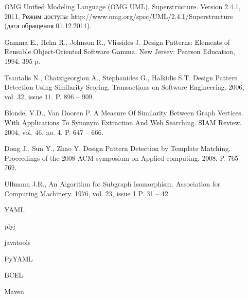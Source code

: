 \begin{thebibliography}{1}

\begin{flushleft}
OMG Unified Modeling Language (OMG UML), Superstructure. Version 2.4.1, 2011, Режим доступа: http://www.omg.org/spec/UML/2.4.1/Superstructure (дата обращения 01.12.2014).
\end{flushleft}

\begin{flushleft}
Gamma E., Helm R., Johnson R., Vlissides J. Design Patterns: Elements of Reusable Object-Oriented Software Gamma. New Jersey: Pearson Education, 1994. 395 p.
\end{flushleft}

\begin{flushleft}
Tsantalis N., Chatzigeorgiou A., Stephanides G., Halkidis S.T. Design Pattern Detection Using Similarity Scoring. Transactions on Software Engineering. 2006, vol. 32, issue 11. P. 896 – 909.
\end{flushleft}

\begin{flushleft}
Blondel V.D., Van Dooren P. A Measure Of Similarity Between Graph Vertices. With Applications To Synonym Extraction And Web Searching. SIAM Review. 2004, vol. 46, no. 4. P. 647 – 666.
\end{flushleft}

\begin{flushleft}
Dong J., Sun Y., Zhao Y. Design Pattern Detection by Template Matching. Proceedings of the 2008 ACM symposium on Applied computing. 2008. P. 765 – 769.
\end{flushleft}

\begin{flushleft}
Ullmann J.R., An Algorithm for Subgraph Isomorphism. Association for Computing Machinery. 1976, vol. 23, issue 1 P. 31 – 42.
\end{flushleft}

\begin{flushleft}
YAML
\end{flushleft}

\begin{flushleft}
plyj
\end{flushleft}

\begin{flushleft}
javatools
\end{flushleft}

\begin{flushleft}
PyYAML
\end{flushleft}

\begin{flushleft}
BCEL
\end{flushleft}

\begin{flushleft}
Maven
\end{flushleft}

\end{thebibliography}

